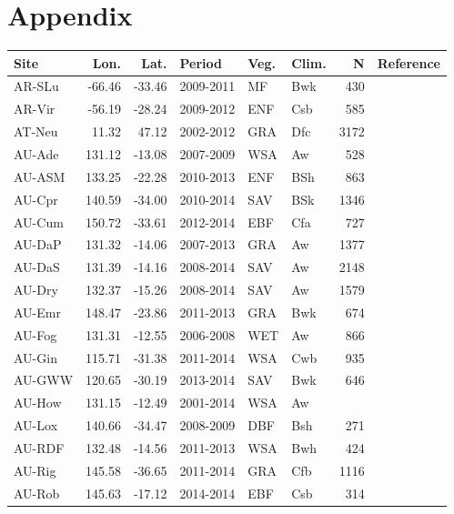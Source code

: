 \documentclass{myreport}
\begin{document}
\clearpage


\section{Appendix}

\begin{longtable}{lrrlllrl}
  \hline
 Site & Lon. & Lat. & Period & Veg. & Clim. & N & Reference \\ 
  \hline
 AR-SLu & -66.46 & -33.46 & 2009-2011 & MF & Bwk & 430 & \cite{AR-SLu} \\ 
 AR-Vir & -56.19 & -28.24 & 2009-2012 & ENF & Csb & 585 & \cite{AR-Vir} \\ 
 AT-Neu & 11.32 & 47.12 & 2002-2012 & GRA & Dfc & 3172 & \cite{AT-Neu} \\ 
 AU-Ade & 131.12 & -13.08 & 2007-2009 & WSA & Aw & 528 & \cite{AU-Ade} \\ 
 AU-ASM & 133.25 & -22.28 & 2010-2013 & ENF & BSh & 863 & \cite{AU-ASM} \\ 
 AU-Cpr & 140.59 & -34.00 & 2010-2014 & SAV & BSk & 1346 & \cite{AU-Cpr} \\ 
 AU-Cum & 150.72 & -33.61 & 2012-2014 & EBF & Cfa & 727 & \cite{AU-Cum} \\ 
 AU-DaP & 131.32 & -14.06 & 2007-2013 & GRA & Aw & 1377 & \cite{AU-DaP} \\ 
 AU-DaS & 131.39 & -14.16 & 2008-2014 & SAV & Aw & 2148 & \cite{AU-DaS} \\ 
 AU-Dry & 132.37 & -15.26 & 2008-2014 & SAV & Aw & 1579 & \cite{AU-Dry} \\ 
 AU-Emr & 148.47 & -23.86 & 2011-2013 & GRA & Bwk & 674 & \cite{AU-Emr} \\ 
 AU-Fog & 131.31 & -12.55 & 2006-2008 & WET & Aw & 866 & \cite{AU-Fog} \\ 
 AU-Gin & 115.71 & -31.38 & 2011-2014 & WSA & Cwb & 935 & \cite{AU-Gin} \\ 
 AU-GWW & 120.65 & -30.19 & 2013-2014 & SAV & Bwk & 646 & \cite{AU-GWW} \\ 
 AU-How & 131.15 & -12.49 & 2001-2014 & WSA & Aw &  & \cite{AU-How} \\ 
 AU-Lox & 140.66 & -34.47 & 2008-2009 & DBF & Bsh & 271 & \cite{AU-Lox} \\ 
 AU-RDF & 132.48 & -14.56 & 2011-2013 & WSA & Bwh & 424 & \cite{AU-RDF} \\ 
 AU-Rig & 145.58 & -36.65 & 2011-2014 & GRA & Cfb & 1116 & \cite{AU-Rig} \\ 
 AU-Rob & 145.63 & -17.12 & 2014-2014 & EBF & Csb & 314 & \cite{AU-Rob} \\ 

\end{longtable}
\end{document}
